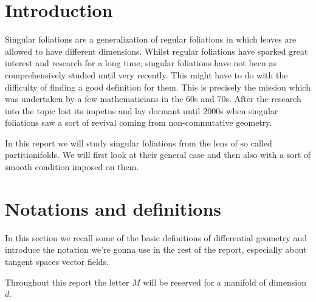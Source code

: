 



\begin{titlepage}
   \begin{center}
       \vspace*{4cm}

       {\LARGE
       \bf
       A Short Introduction into Singular Foliations from the Perspective of Partitionifolds

       \vspace{1cm}

       {\large
       \textbf{Elias Garcia-Naze \& Max Sundblad}

       \vspace{0.5cm}

       July 2025
   \end{center}
\end{titlepage}

\tableofcontents

\section{Introduction}
    Singular foliations are a generalization of regular foliations in which leaves are allowed to have different dimensions. Whilst regular foliations have sparked great interest and research for a long time, singular foliations have not been as comprehensively studied until very recently. This might have to do with the difficulty of finding a good definition for them. This is precisely the mission which was undertaken by a few mathematicians in the 60s and 70s. After the research into the topic lost its impetus and lay dormant until 2000s when singular foliations saw a sort of revival coming from non-commutative geometry.

    In this report we will study singular foliations from the lens of so called partitionifolds. We will first look at their general case and then also with a sort of smooth condition imposed on them.

\section{Notations and definitions}
    In this section we recall some of the basic definitions of differential geometry and introduce the notation we're gonna use in the rest of the report, especially about tangent spaces vector fields.

    Throughout this report the letter $M$ will be reserved for a manifold of dimension $d$.

